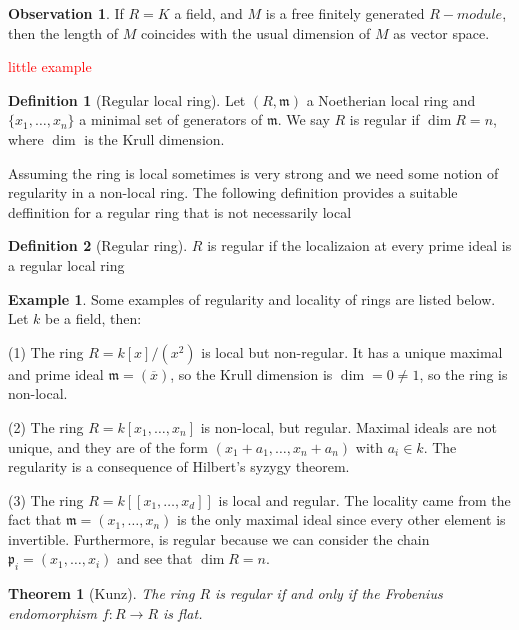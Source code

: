 \documentclass[leqno]{article}
\newtheorem{theorem}{Theorem}[section]
\theoremstyle{definition}
\newtheorem{definition}{Definition}[section]
\newtheorem{observation}{Observation}[section]
\newtheorem{example}{Example}[section]
\newcommand{\com}[1]{\textcolor{red}{#1}}
\begin{document}
\begin{observation} If $R = K$ a field, and $M$ is a free finitely generated $R-module$, then the length of  $M$ coincides with the usual dimension of $M$ as vector space.
\end{observation}

\com{little example}

\begin{definition}[Regular local ring] Let $(R, \mathfrak{m})$ a Noetherian local ring and $\{x_1, \ldots, x_n\}$ a minimal set of generators of $\mathfrak{m}$. We say $R$ is regular if $\dim R=n$, where  $\dim$ is the Krull dimension.
\end{definition}

Assuming the ring is local sometimes is very strong and we need some notion of regularity in a non-local ring. The following definition provides a suitable deffinition for a regular ring that is not necessarily local
\begin{definition}[Regular ring] $R$ is regular if the localizaion at every prime ideal is a regular local ring
\end{definition}

\begin{example} Some examples of regularity and locality of rings are listed below. Let $k$ be a field, then:

  (1) The ring $R = k[x] / (x^2)$ is local but non-regular. It has a unique maximal and prime ideal  $\mathfrak{m}=(\overline{x})$, so the Krull dimension is $\dim = 0\neq 1$, so the ring is non-local.

  (2) The ring $R = k[x_1, \ldots, x_n]$ is non-local, but regular. Maximal ideals are not unique, and they are of the form $(x_1+a_1, \ldots, x_n+a_n)$ with  $a_i\in k$. The regularity is a consequence of Hilbert's syzygy theorem.

  (3) The ring $R = k[[x_1, \ldots, x_d]]$ is local and regular. The locality came from the fact that $\mathfrak{m} = (x_1, \ldots, x_n)$ is the only maximal ideal since every other element is invertible. Furthermore, is regular because we can consider the chain $\mathfrak{p}_i = (x_1, \ldots, x_i)$ and see that $\dim R = n$.
\end{example}

\begin{theorem}[Kunz] The ring  $R$ is regular if and only if the Frobenius endomorphism $f:R\to R$ is flat.
\end{theorem}



\nocite{*}


\end{document}
